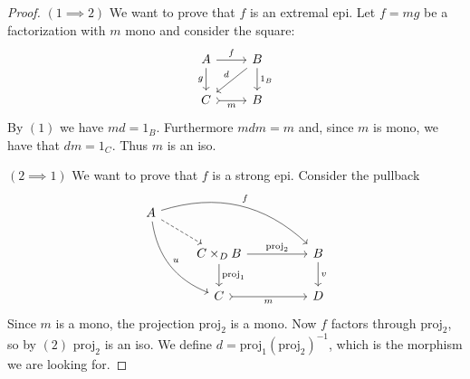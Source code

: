 \begin{subbox}{}
    \begin{proof}
        $(1 \implies 2)$ We want to prove that $f$ is an extremal epi. Let $f=mg$ be a factorization with $m$ mono and consider the square:
        \[
\begin{tikzcd}
    A \arrow[r, "f"] \arrow[d, "g"'] & B \arrow[d, "1_B"] \arrow[ld, "d"'] \\
    C \arrow[r, "m"', tail]          & B                                  
    \end{tikzcd}
    \]
    By $(1)$ we have $md = 1_B$. Furthermore $mdm = m$ and, since $m$ is mono, we have that $dm = 1_C$. Thus $m$ is an iso.

        $(2 \implies 1)$ We want to prove that $f$ is a strong epi. Consider the pullback
        \[
\begin{tikzcd}
    A \arrow[rd, dashed] \arrow[rrrd, "f", bend left] \arrow[rdd, "u", bend right] &                                                                       &  &                  \\
                                                                                   & C\times_DB \arrow[d, "\mathrm{proj}_1"] \arrow[rr, "\mathrm{proj}_2"] &  & B \arrow[d, "v"] \\
                                                                                   & C \arrow[rr, "m"', tail]                                              &  & D               
    \end{tikzcd}
    \]
Since $m$ is a mono, the projection $\mathrm{proj}_2$ is a mono. Now $f$ factors through $\mathrm{proj}_2$, so by $(2)$ $\mathrm{proj}_2$ is an iso. We define $d=\mathrm{proj}_1 (\mathrm{proj}_2)^{-1}$, which is the morphism we are looking for.
    \end{proof}
\end{subbox}

